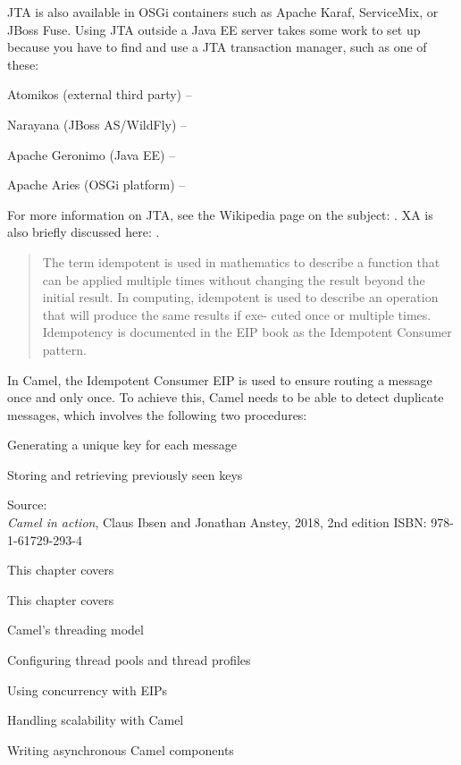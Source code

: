 \documentclass[Screen16to9,17pt]{foils}
\begin{document}
JTA is also available in OSGi containers such as Apache Karaf, ServiceMix, or JBoss
Fuse. Using JTA outside a Java EE server takes some work to set up because you have to
find and use a JTA transaction manager, such as one of these:
\begin{list2}
\item Atomikos (external third party) -- 
\item  Narayana (JBoss AS/WildFly) -- 
\item  Apache Geronimo (Java EE) -- 
\item  Apache Aries (OSGi platform) -- 
\end{list2}

For more information on JTA, see the Wikipedia page on the subject:
 . XA is also briefly discussed here:  .



\begin{quote}
  The term idempotent is used in mathematics to describe a function that can be applied
  multiple times without changing the result beyond the initial result. In computing,
  idempotent is used to describe an operation that will produce the same results if exe-
  cuted once or multiple times.
  Idempotency is documented in the EIP book as the Idempotent Consumer pattern.
\end{quote}

In Camel, the Idempotent Consumer EIP is used to ensure routing a message once
and only once. To achieve this, Camel needs to be able to detect duplicate messages,
which involves the following two procedures:

\begin{list2}
\item Generating a unique key for each message
\item Storing and retrieving previously seen keys
\end{list2}

Source: {\footnotesize\\
\emph{Camel in action}, Claus Ibsen and Jonathan Anstey, 2018, 2nd edition
ISBN: 978-1-61729-293-4}


This chapter covers
\begin{list2}
\item This chapter covers
\item Camel’s threading model
\item Configuring thread pools and thread profiles
\item Using concurrency with EIPs
\item Handling scalability with Camel
\item Writing asynchronous Camel components
\end{list2}
\end{document}
